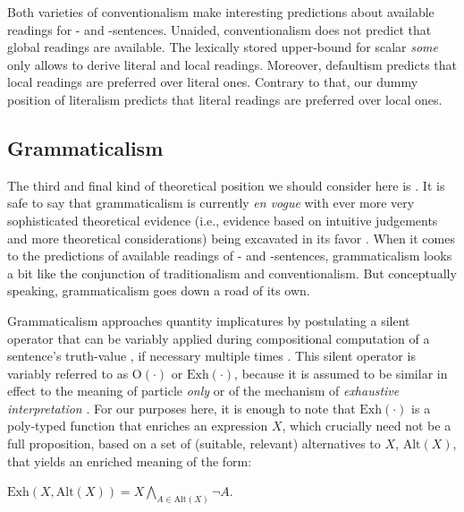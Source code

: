 \documentclass[fleqn,reqno,10pt,draft]{article}
\newcommand{\as}{\acro{as}}
\renewcommand{\es}{\acro{es}}
\newcommand{\exh}{\ensuremath{\mathrm{Exh}}}
\newcommand{\alt}{\ensuremath{\mathrm{Alt}}}
\begin{document}
Both varieties of conventionalism make interesting predictions about
available readings for \as- and \es-sentences. Unaided,
conventionalism does not predict that global readings are
available. The lexically stored upper-bound for scalar \emph{some}
only allows to derive literal and local readings. Moreover, defaultism
predicts that local readings are preferred over literal ones. Contrary
to that, our dummy position of literalism predicts that literal
readings are preferred over local ones.

\subsection{Grammaticalism}
\label{sec:grammaticalism}

The third and final kind of theoretical position we should consider
here is . It is safe to say that grammaticalism
is currently \emph{en vogue} with ever more very sophisticated
theoretical evidence (i.e., evidence based on intuitive judgements and
more theoretical considerations) being excavated in its favor
\citep[c.f.][]{Chierchia2006:Broaden-Your-Vi,Fox2007:Free-Choice-and,Magri2011:Another-Argumen,Sauerland2012:The-Computation,ChierchiaFox2008:The-Grammatical,Chierchia2012:FC-Nominals-and}. When
it comes to the predictions of available readings of \as- and
\es-sentences, grammaticalism looks a bit like the conjunction of
traditionalism and conventionalism. But conceptually speaking,
grammaticalism goes down a road of its own.

Grammaticalism approaches quantity implicatures by postulating a
silent operator that can be variably applied during compositional
computation of a sentence's truth-value
\citep{Chierchia2006:Broaden-Your-Vi}, if necessary multiple times
\citep{Fox2007:Free-Choice-and}. This silent operator is variably
referred to as $\mathrm{O}(\cdot)$ or $\exh(\cdot)$, because it is
assumed to be similar in effect to the meaning of particle \emph{only}
or of the mechanism of \emph{exhaustive interpretation}
\citep{GroenendijkStokhofThesis1984,Stechowvon-StechowZimmermann1984:Term-Answers-an,Rooijvan-RooijSchulz2013:Exhaustive-Inte,vanRooijSchulz:ExhaustiveInterpretation,Fox2007:Free-Choice-and}. For
our purposes here, it is enough to note that $\exh(\cdot)$ is a
poly-typed function that enriches an expression $X$, which crucially
need not be a full proposition, based on a set of (suitable, relevant)
alternatives to $X$, $\alt(X)$, that yields an enriched meaning of the
form:
\begin{exe}
  \ex \label{bsp:Exh-Def} $\exh(X,\alt(X)) = X \bigwedge_{A \in
      \alt(X)} \neg A$.
\end{exe}
\end{document}
